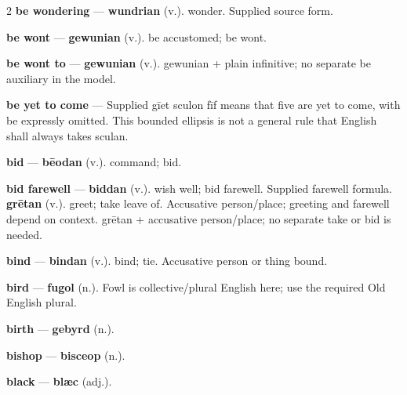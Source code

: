 \begin{multicols}{2}
\textbf{be wondering} — \textbf{wundrian} (v.). wonder. Supplied source form.\par
\textbf{be wont} — \textbf{gewunian} (v.). be accustomed; be wont.\par
\textbf{be wont to} — \textbf{gewunian} (v.). gewunian + plain infinitive; no separate be auxiliary in the model.\par
\textbf{be yet to come} — Supplied gīet sculon fīf means that five are yet to come, with be expressly omitted. This bounded ellipsis is not a general rule that English shall always takes sculan.\par
\textbf{bid} — \textbf{bēodan} (v.). command; bid.\par
\textbf{bid farewell} — \textbf{biddan} (v.). wish well; bid farewell. Supplied farewell formula. \textbf{grētan} (v.). greet; take leave of. Accusative person/place; greeting and farewell depend on context. grētan + accusative person/place; no separate take or bid is needed.\par
\textbf{bind} — \textbf{bindan} (v.). bind; tie. Accusative person or thing bound.\par
\textbf{bird} — \textbf{fugol} (n.). Fowl is collective/plural English here; use the required Old English plural.\par
\textbf{birth} — \textbf{gebyrd} (n.).\par
\textbf{bishop} — \textbf{bisceop} (n.).\par
\textbf{black} — \textbf{blæc} (adj.).\par

\end{multicols}

